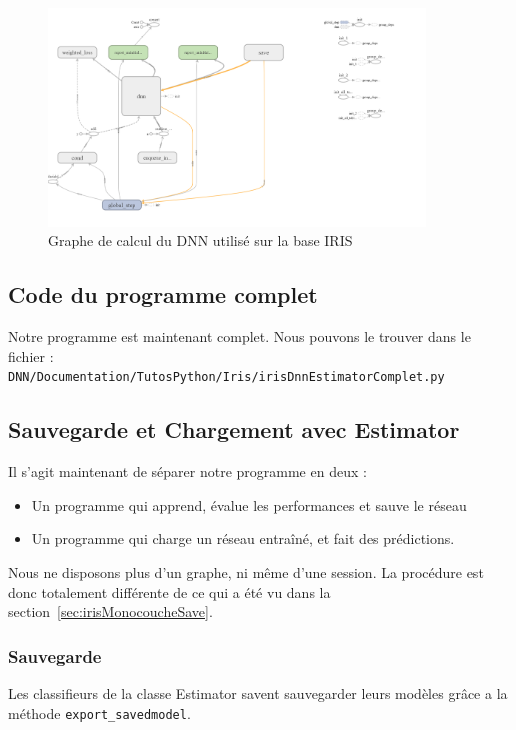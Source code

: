 \documentclass[a4paper,11pt]{book}
\begin{document}
\begin{figure}[H]

\begin{center}
\includegraphics[width=10cm]{./figures/graphIrisDNN.png} 
\end{center}
\caption{Graphe de calcul du DNN utilisé sur la base IRIS}
\end{figure}

\subsection{Code du programme complet}

Notre programme est maintenant complet. Nous pouvons le trouver dans le fichier :\\
\verb+DNN/Documentation/TutosPython/Iris/irisDnnEstimatorComplet.py+



\subsection{Sauvegarde et Chargement avec Estimator }
\label{sec:irisDnnSave}
Il s'agit maintenant de séparer notre programme en deux :
\begin{itemize}
\item Un programme qui apprend, évalue les performances et sauve le réseau
\item Un programme qui charge un réseau entraîné, et fait des prédictions.
\end{itemize}

Nous ne disposons plus d'un graphe, ni même d'une session. La procédure est donc totalement différente de ce qui a été vu dans la section~\ref{sec:irisMonocoucheSave}.

\subsubsection{Sauvegarde}
Les classifieurs de la classe Estimator savent sauvegarder leurs modèles grâce a la méthode \verb+export_savedmodel+.
\end{document}
